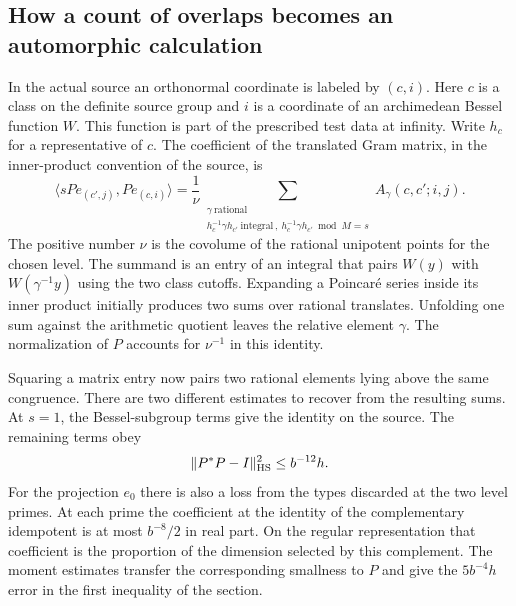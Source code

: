 \documentclass[11pt,letterpaper]{article}
\begin{document}
\subsection{How a count of overlaps becomes an automorphic calculation}
\label{sec:moment-unfolding}
In the actual source an orthonormal coordinate is labeled by $(c,i)$. Here $c$ is a class on the definite source group and $i$ is a coordinate of an archimedean Bessel function $W$. This function is part of the prescribed test data at infinity. Write $h_c$ for a representative of $c$. The coefficient of the translated Gram matrix, in the inner-product convention of the source, is
\[
 \langle sPe_{(c',j)},Pe_{(c,i)}\rangle
   =\frac{1}{\nu}\!
    \sum_{\substack{\gamma\ \mathrm{rational}\\
           h_c^{-1}\gamma h_{c'}\ \mathrm{integral}\,,\ 
           h_c^{-1}\gamma h_{c'}\bmod M=s}}
       A_\gamma(c,c';i,j).
\]
The positive number $\nu$ is the covolume of the rational unipotent points for the chosen level. The summand is an entry of an integral that pairs $W(y)$ with $W(\gamma^{-1}y)$ using the two class cutoffs. Expanding a Poincar\'e series inside its inner product initially produces two sums over rational translates. Unfolding one sum against the arithmetic quotient leaves the relative element $\gamma$. The normalization of $P$ accounts for $\nu^{-1}$ in this identity.

Squaring a matrix entry now pairs two rational elements lying above the same congruence. There are two different estimates to recover from the resulting sums. At $s=1$, the Bessel-subgroup terms give the identity on the source. The remaining terms obey
\[
                 \|P^*P-I\|_{\rm HS}^2\le b^{-12}h.
\]
For the projection $e_0$ there is also a loss from the types discarded at the two level primes. At each prime the coefficient at the identity of the complementary idempotent is at most $b^{-8}/2$ in real part. On the regular representation that coefficient is the proportion of the dimension selected by this complement. The moment estimates transfer the corresponding smallness to $P$ and give the $5b^{-4}h$ error in the first inequality of the section.
\end{document}
